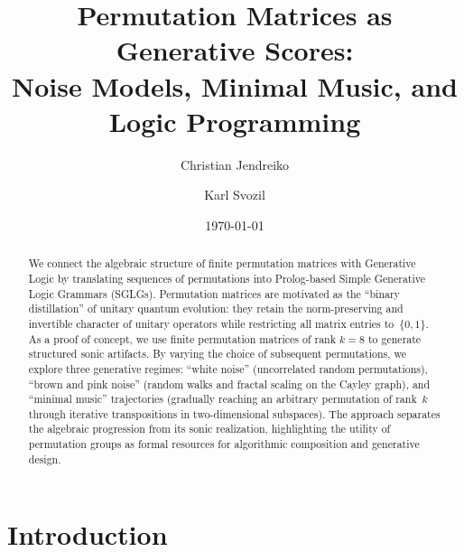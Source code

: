 \documentclass[
  twocolumn,
  aps,
  pra,
  showkeys,
  amsmath,amssymb,
  longbibliography
]{revtex4-2}
\begin{document}
\title{Permutation Matrices as Generative Scores:\\
Noise Models, Minimal Music, and Logic Programming}

\author{Christian Jendreiko}
\author{Karl Svozil}

\date{\today}

\begin{abstract}
We connect the algebraic structure of finite permutation
matrices with Generative Logic by translating sequences of
permutations into Prolog-based Simple Generative Logic
Grammars (SGLGs).
Permutation matrices are motivated as the ``binary
distillation'' of unitary quantum evolution: they retain the
norm-preserving and invertible character of unitary operators
while restricting all matrix entries to~$\{0,1\}$.
As a proof of concept, we use finite permutation matrices of
rank $k=8$ to generate structured sonic artifacts.
By varying the choice of subsequent permutations, we explore
three generative regimes:
``white noise'' (uncorrelated random permutations),
``brown and pink noise'' (random walks and fractal scaling on
the Cayley graph), and
``minimal music'' trajectories (gradually reaching an arbitrary
permutation of rank~$k$ through iterative transpositions in
two-dimensional subspaces).
The approach separates the algebraic progression from its
sonic realization, highlighting the utility of permutation
groups as formal resources for algorithmic composition and
generative design.
\end{abstract}


\maketitle

\section{Introduction}
\label{sec:intro}
\end{document}
